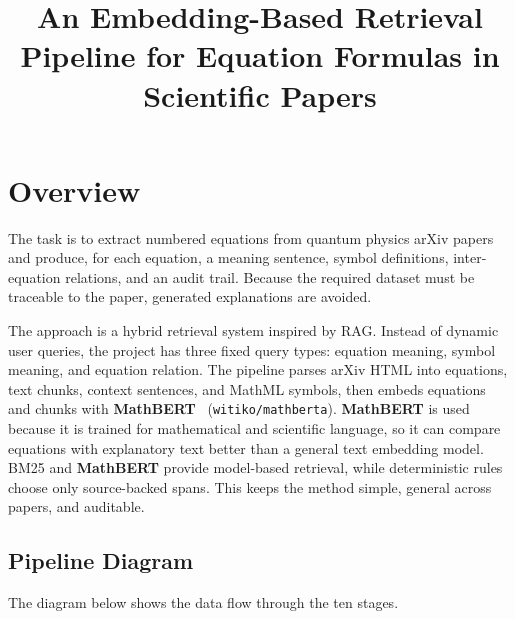 \documentclass[11pt]{article}
\title{\textbf{An Embedding-Based Retrieval Pipeline for Equation Formulas in Scientific Papers}}
\author{}
\date{}
\begin{document}
\maketitle

\section{Overview}

The task is to extract numbered equations from quantum physics arXiv
papers and produce, for each equation, a meaning sentence, symbol
definitions, inter-equation relations, and an audit trail.
Because the required dataset must be traceable to the paper, generated
explanations are avoided.

The approach is a hybrid retrieval system inspired by RAG\@.
Instead of dynamic user queries, the project has three fixed query types:
equation meaning, symbol meaning, and equation relation.
The pipeline parses arXiv HTML into equations, text chunks, context
sentences, and MathML symbols, then embeds equations and chunks with
\textbf{MathBERT}~\cite{peng2021mathbert} (\texttt{witiko/mathberta}).
\textbf{MathBERT} is used because it is trained for mathematical and scientific
language, so it can compare equations with explanatory text better than
a general text embedding model.
BM25 and \textbf{MathBERT} provide model-based retrieval, while deterministic
rules choose only source-backed spans.
This keeps the method simple, general across papers, and auditable.

\clearpage
\subsection{Pipeline Diagram}

The diagram below shows the data flow through the ten stages.
\end{document}
